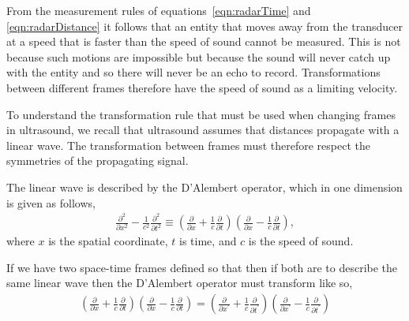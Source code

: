From the measurement rules of equations~\ref{eqn:radarTime} and \ref{eqn:radarDistance}
it follows that an entity that moves away from the transducer at a speed that is faster than the speed of sound cannot be measured.  
This is not because such motions are impossible but because the sound will never catch  up with the entity and so there will never be an echo to record.
Transformations between different frames therefore have the speed of sound as a limiting velocity.


To understand the transformation rule that must be used when changing frames in ultrasound,
we  recall that ultrasound assumes that distances propagate with a linear wave.
The transformation between frames must therefore respect the symmetries of the propagating signal.


The linear wave is described by the D'Alembert operator, which in one dimension is given as follows,
\begin{align}
  \frac{\partial^2 }{\partial x^2} - \frac{1}{c^2}\frac{\partial^2 }{\partial t^2} \equiv
  \left(\frac{\partial }{\partial x}  + \frac{1}{c}\frac{\partial }{\partial t}\right)
  \left(\frac{\partial }{\partial x}  - \frac{1}{c}\frac{\partial }{\partial t}\right),
\end{align}
where $x$ is the spatial coordinate, $t$ is time, and $c$ is the speed of sound.

If we have two space-time frames defined so that
then if both are to describe the same linear wave then the D'Alembert operator must transform like so,
\begin{align}
  \left(\frac{\partial }{\partial x}  + \frac{1}{c}\frac{\partial }{\partial t}\right)
  \left(\frac{\partial }{\partial x}  - \frac{1}{c}\frac{\partial }{\partial t}\right) =
  \left(\frac{\partial }{\partial x^\prime}  + \frac{1}{c}\frac{\partial }{\partial t^\prime}\right)
  \left(\frac{\partial }{\partial x^\prime}  - \frac{1}{c}\frac{\partial }{\partial t^\prime}\right)
\end{align}

